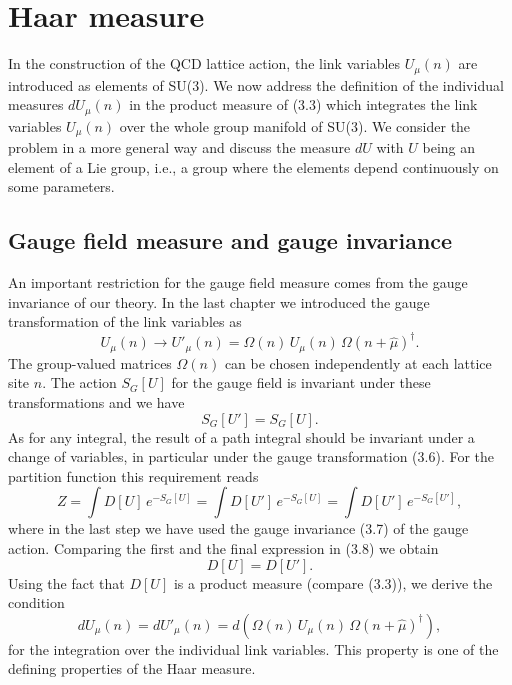 \section{Haar measure}

In the construction of the QCD lattice action, the link variables $U_\mu(n)$
are introduced as elements of SU(3). We now address the definition of the
individual measures $dU_\mu(n)$ in the product measure of (3.3) which
integrates the link variables $U_\mu(n)$ over the whole group manifold of
SU(3). We consider the problem in a more general way and discuss the measure
$dU$ with $U$ being an element of a Lie group, i.e., a group where the elements
depend continuously on some parameters.

\subsection{Gauge field measure and gauge invariance}

An important restriction for the gauge field measure comes from the gauge
invariance of our theory. In the last chapter we introduced the gauge
transformation of the link variables as
\begin{equation}
  U_\mu(n) \to U'_\mu(n) = \Omega(n)\,U_\mu(n)\,\Omega(n+\hat\mu)^\dagger .
\end{equation}
The group-valued matrices $\Omega(n)$ can be chosen independently at each
lattice site $n$. The action $S_G[U]$ for the gauge field is invariant under
these transformations and we have
\begin{equation}
  S_G[U'] = S_G[U].
\end{equation}
As for any integral, the result of a path integral should be invariant under a
change of variables, in particular under the gauge transformation (3.6). For
the partition function this requirement reads
\begin{equation}
  Z = \int D[U]\,e^{-S_G[U]}
    = \int D[U']\,e^{-S_G[U]}
    = \int D[U']\,e^{-S_G[U']},
\end{equation}
where in the last step we have used the gauge invariance (3.7) of the gauge
action. Comparing the first and the final expression in (3.8) we obtain
\begin{equation}
  D[U] = D[U'].
\end{equation}
Using the fact that $D[U]$ is a product measure (compare (3.3)), we derive the
condition
\begin{equation}
  dU_\mu(n) = dU'_\mu(n) = d\!\left(\Omega(n)\,U_\mu(n)\,\Omega(n+\hat\mu)^\dagger\right),
\end{equation}
for the integration over the individual link variables. This property is one of
the defining properties of the Haar measure.

